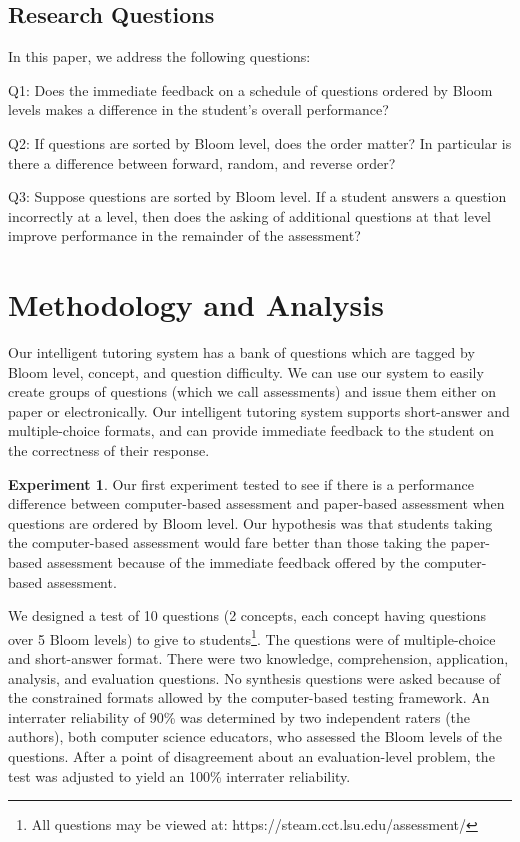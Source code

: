 \documentclass[a4paper,twocolumn]{article}
\begin{document}
\subsection{Research Questions}

In this paper, we address the following questions:

Q1: Does the immediate feedback on a schedule of questions ordered by Bloom
levels makes a difference in the student's overall performance?

Q2: If questions are sorted by Bloom level, does the order matter? In
particular is there a difference between forward, random, and reverse order?

Q3: Suppose questions are sorted by Bloom level. If a student answers a
question incorrectly at a level, then does the asking of additional questions
at that level improve performance in the remainder of the assessment?

\section{Methodology and Analysis}

Our intelligent tutoring system has a bank of questions which are tagged by
Bloom level, concept, and question difficulty.  We can use our system to easily
create groups of questions (which we call assessments) and issue them either on
paper or electronically.  Our intelligent tutoring system supports short-answer
and multiple-choice formats, and can provide immediate feedback to the student
on the correctness of their response.

\textbf{Experiment 1}. Our first experiment tested to see if there is a
performance difference between computer-based assessment and paper-based
assessment when questions are ordered by Bloom level.  Our hypothesis was that
students taking the computer-based assessment would fare better than those
taking the paper-based assessment because of the immediate feedback offered by
the computer-based assessment.

We designed a test of 10 questions (2 concepts, each concept having questions
over 5 Bloom levels) to give to students\footnote{All questions may be viewed
at: https://steam.cct.lsu.edu/assessment/}. The questions were of
multiple-choice and short-answer format.  There were two knowledge,
comprehension, application, analysis, and evaluation questions.  No synthesis
questions were asked because of the constrained formats allowed by the
computer-based testing framework.  An interrater reliability of 90\% was
determined by two independent raters (the authors), both computer science
educators, who assessed the Bloom levels of the questions.  After a point of
disagreement about an evaluation-level problem, the test was adjusted to yield
an 100\% interrater reliability.
\end{document}

